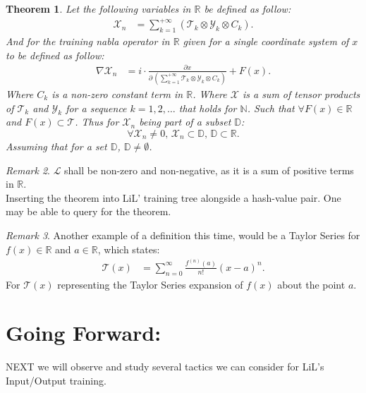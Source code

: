 \documentclass[10pt]{article}
\theoremstyle{plain}
\newtheorem{theorem}{Theorem}[section]
\theoremstyle{definition}
\theoremstyle{remark}
\newtheorem{remark}[theorem]{Remark}
\begin{document}
\begin{theorem}
Let the following variables in $\mathbb{R}$ be defined as follow:
\begin{align*}
    \mathcal{X}_n &= \sum_{k=1}^{+\infty} (\mathcal{T}_k \otimes \mathcal{Y}_k \otimes C_k).
\end{align*}
And for the training nabla operator in $\mathbb{R}$ given for a single coordinate system of $x$ to be defined as follow:
\begin{align*}
	\nabla \mathcal{X}_n &= i \cdot \frac{\partial x}{\partial \, (\sum_{k=1}^{+\infty} \mathcal{T}_k \otimes \mathcal{Y}_k \otimes C_k)} + F(x).
\end{align*}
Where $C_k$ is a non-zero constant term in $\mathbb{R}$. Where $\mathcal{X}$ is a sum of tensor products of $\mathcal{T}_k$ and $\mathcal{Y}_k$ for a sequence $k=1, 2, \ldots$ that holds for $\mathbb{N}$. Such that $\forall F(x) \in \mathbb{R}$ and $F(x) \subset \mathcal{T}$. Thus for $\mathcal{X}_n$ being part of a subset $\mathbb{D}$:
\begin{equation}
	\forall \mathcal{X}_n \neq 0, \, \mathcal{X}_n \subset \mathbb{D}, \, \mathbb{D} \subset \mathbb{R}.
\end{equation}
Assuming that for a set $\mathbb{D}$, $\mathbb{D} \neq \emptyset$.
\end{theorem}

\begin{remark}
    $\mathcal{L}$ shall be non-zero and non-negative, as it is a sum of positive terms in $\mathbb{R}$.\\
	Inserting the theorem into LiL' training tree alongside a hash-value pair. One may be able to query for the theorem.
\end{remark}

\begin{remark}
	Another example of a definition this time, would be a Taylor Series for $f(x) \in \mathbb{R}$ and $a \in \mathbb{R}$, which states:
	\begin{align*}
		\mathcal{T}(x) &= \sum_{n=0}^{\infty} \frac{f^{(n)}(a)}{n!} (x-a)^n.
	\end{align*}
	For $\mathcal{T}(x)$ representing the Taylor Series expansion of $f(x)$ about the point $a$.
\end{remark}

\section{Going Forward:}

\lettrine[lines=1, lhang=0.1, loversize=0.2]{N}EXT we will observe and study several tactics we can consider for LiL's Input/Output training.

\nocite{*}

\nocite{*}



\end{document}
